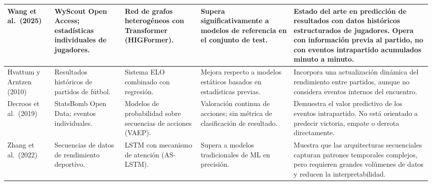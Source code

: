\begin{table}[H]
\begin{tabularx}{\textwidth}{|p{2.4cm}|p{2.5cm}|p{2.6cm}|p{2.2cm}|X|}
        Wang et al.\ (2025)                                                              &
        WyScout Open Access; estadísticas individuales de jugadores.                     &
        Red de grafos heterogéneos con Transformer (HIGFormer).                          &
        Supera significativamente a modelos de referencia en el conjunto de test.        &
        Estado del arte en predicción de resultados con datos históricos estructurados de jugadores. Opera con información previa al partido, no con eventos intrapartido acumulados minuto a minuto.                  \\
        \hline

        Hvattum y Arntzen (2010)                                                         &
        Resultados históricos de partidos de fútbol.                                     &
        Sistema ELO combinado con regresión.                                             &
        Mejora respecto a modelos estáticos basados en estadísticas previas.             &
        Incorpora una actualización dinámica del rendimiento entre partidos, aunque no considera eventos internos del encuentro.                                                                                       \\
        \hline

        Decroos et al.\ (2019)                                                           &
        StatsBomb Open Data; eventos individuales.                                       &
        Modelos de probabilidad sobre secuencias de acciones (VAEP).                     &
        Valoración continua de acciones; sin métrica de clasificación de resultado.      &
        Demuestra el valor predictivo de los eventos intrapartido. No está orientado a predecir victoria, empate o derrota directamente.                                                                               \\
        \hline

        Zhang et al.\ (2022)                                                             &
        Secuencias de datos de rendimiento deportivo.                                    &
        LSTM con mecanismo de atención (AS-LSTM).                                        &
        Supera a modelos tradicionales de ML en precisión.                               &
        Muestra que las arquitecturas secuenciales capturan patrones temporales complejos, pero requieren grandes volúmenes de datos y reducen la interpretabilidad.                                                   \\
        \hline


\end{tabularx}
\end{table}

